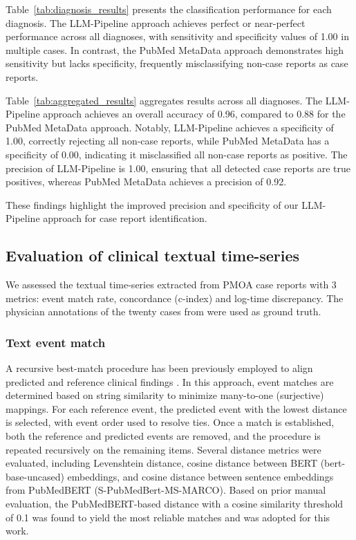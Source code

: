 \documentclass[pmlr]{jmlr}%
\begin{document}
Table~\ref{tab:diagnosis_results} presents the classification performance for each diagnosis. The LLM-Pipeline approach achieves perfect or near-perfect performance across all diagnoses, with sensitivity and specificity values of 1.00 in multiple cases. In contrast, the PubMed MetaData approach demonstrates high sensitivity but lacks specificity, frequently misclassifying non-case reports as case reports.

Table~\ref{tab:aggregated_results} aggregates results across all diagnoses. The LLM-Pipeline approach achieves an overall accuracy of 0.96, compared to 0.88 for the PubMed MetaData approach. Notably, LLM-Pipeline achieves a specificity of 1.00, correctly rejecting all non-case reports, while PubMed MetaData has a specificity of 0.00, indicating it misclassified all non-case reports as positive. The precision of LLM-Pipeline is 1.00, ensuring that all detected case reports are true positives, whereas PubMed MetaData achieves a precision of 0.92.

These findings highlight the improved precision and specificity of our LLM-Pipeline approach for case report identification.



\subsection{Evaluation of clinical textual time-series}

We assessed the textual time-series extracted from PMOA case reports with 3 metrics: event match rate, concordance (c-index) and log-time discrepancy.  The physician annotations of the twenty cases from \cite{frattallone2024using,wang2025large} were used as ground truth.

\subsubsection{Text event match}

A recursive best-match procedure has been previously employed to align predicted and reference clinical findings \cite{wang2025large}. In this approach, event matches are determined based on string similarity to minimize many-to-one (surjective) mappings. For each reference event, the predicted event with the lowest distance is selected, with event order used to resolve ties. Once a match is established, both the reference and predicted events are removed, and the procedure is repeated recursively on the remaining items. Several distance metrics were evaluated, including Levenshtein distance, cosine distance between BERT (bert-base-uncased) embeddings, and cosine distance between sentence embeddings from PubMedBERT (S-PubMedBert-MS-MARCO). Based on prior manual evaluation, the PubMedBERT-based distance with a cosine similarity threshold of 0.1 was found to yield the most reliable matches and was adopted for this work.
\end{document}
